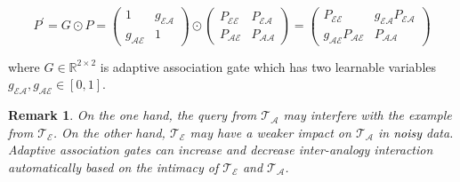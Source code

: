 \documentclass{article} \usepackage{iclr2023_conference,times}
\newtheorem{remark}{\noindent \textbf{Remark}}
\begin{document}
\begin{small}
\begin{equation}
    P^\prime = G\odot P=
    \begin{pmatrix}
        1 & g_\mathcal{EA} \\
        g_\mathcal{AE} & 1
    \end{pmatrix}
    \odot
    \begin{pmatrix}
        P_\mathcal{EE} & P_\mathcal{EA} \\
        P_\mathcal{AE} & P_\mathcal{AA}
    \end{pmatrix}
    =
    \begin{pmatrix}
        P_\mathcal{EE} & g_\mathcal{EA}P_\mathcal{EA} \\
        g_\mathcal{AE}P_\mathcal{AE} & P_\mathcal{AA}
    \end{pmatrix}
\end{equation}
\end{small}where $G\in \mathbb{R}^{2\times2}$ is adaptive association gate which has two learnable variables $g_\mathcal{EA}, g_\mathcal{AE} \in [0, 1]$.
\begin{remark}
On the one hand, the query from $\mathcal{T_A}$ may interfere with the example from $\mathcal{T_E}$.
On the other hand, $\mathcal{T_E}$ may have a weaker impact on $\mathcal{T_A}$ in \textcolor{black}{noisy} data. 
Adaptive association gates can increase and decrease inter-analogy interaction automatically based on the intimacy of $\mathcal{T_E}$ and $\mathcal{T_A}$.
\end{remark}
\end{document}
